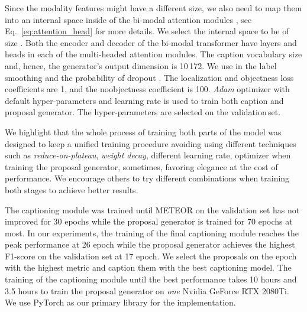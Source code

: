 \documentclass{src/bmvc2k}
\begin{document}
Since the modality features might have a different size, we also need to map them into an internal space inside of the bi-modal attention modules , see Eq.~\eqref{eq:attention_head} for more details. We select the internal space to be of size . Both the encoder and decoder of the bi-modal transformer have  layers and  heads in each of the multi-headed attention modules.  The caption vocabulary size and, hence, the generator's output dimension is 10\,172. We use  in the label smoothing and the probability of dropout . The localization and objectness loss coefficients are 1, and the noobjectness coefficient is 100. \textit{Adam} optimizer with default hyper-parameters \cite{Kingma2014} and learning rate  is used to train both caption and proposal generator. The hyper-parameters are selected on the validation\,set.

We highlight that the whole process of training both parts of the model was designed to keep a unified training procedure avoiding using different techniques such as \textit{reduce-on-plateau}, \textit{weight decay}, different learning rate, optimizer when training the proposal generator, sometimes, favoring elegance at the cost of performance. We encourage others to try different combinations when training both stages to achieve better results.

The captioning module was trained until METEOR on the validation set has not improved for 30 epochs while the proposal generator is trained for 70 epochs at most. In our experiments, the training of the final captioning module reaches the peak performance at 26 epoch while the proposal generator achieves the highest F1-score on the validation set at 17 epoch. We select the proposals on the epoch with the highest metric and caption them with the best captioning model. The training of the captioning module until the best performance takes 10 hours and 3.5 hours to train the proposal generator on \textit{one} Nvidia GeForce RTX 2080Ti. We use PyTorch \cite{PyTorch_Paszke_2019} as our primary library for the implementation.
\end{document}
